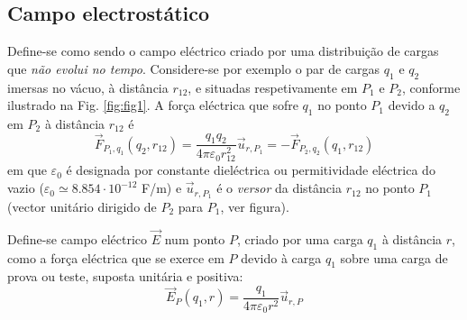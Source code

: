 \documentclass[a4paper,twoside,12pt]{article}      %
\begin{document}
\subsection{\sf Campo electrostático}

Define-se como sendo o campo eléctrico criado por uma distribuição de cargas que \emph{não evolui no tempo}. Considere-se por exemplo o par de cargas $q_1$ e $q_2$ imersas no vácuo, à distância $r_{12}$, e situadas respetivamente em $P_1$ e $P_2$, conforme ilustrado na Fig. \ref{fig:fig1}. A força eléctrica que sofre $q_1$ no ponto $P_1$ devido a $q_2$ em $P_2$ à distância $r_{12}$ é
\begin{equation}
	\vec{F}_{P_1,q_1} (q_2, r_{1 2} ) = \frac{q_1 q_2}{4 \pi \varepsilon_0 r_{1 2}^2} \vec{u}_{r,P_1} = 
	- \vec{F}_{P_2,q_2} (q_1, r_{1 2} )
\end{equation}
em que $\varepsilon_0$  é designada por constante dieléctrica ou permitividade eléctrica do vazio ($\varepsilon_0 \simeq 8.854 \cdot 10^{-12}$ F/m) e	
 $\vec{u}_{r,P_1}$  é o \emph{versor} da distância $r_{1 2} $ no ponto $P_1$  (vector unitário dirigido de $P_2$ para $P_1$, ver figura).

Define-se campo eléctrico $\vec{E}$  num ponto $P$, criado por uma carga $q_1$ à distância $r$, como a força eléctrica que se exerce em $P$  devido à carga $q_1$ sobre uma carga de prova ou teste, suposta unitária e positiva:
\begin{equation}
	\vec{E}_P (q_1, r) = \frac{q_1}{4 \pi \varepsilon_0 r^2} \vec{u}_{r, P} 
\end{equation}
\end{document}
